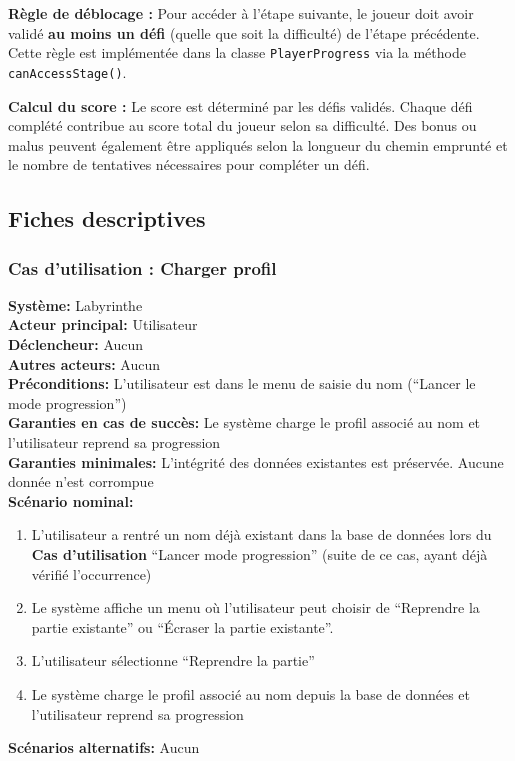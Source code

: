 \documentclass{butexFR}
\begin{document}
\vspace{1em}

\textbf{Règle de déblocage :} Pour accéder à l'étape suivante, le joueur doit avoir validé \textbf{au moins un défi} (quelle que soit la difficulté) de l'étape précédente. Cette règle est implémentée dans la classe \texttt{PlayerProgress} via la méthode \texttt{canAccessStage()}.

\textbf{Calcul du score :} Le score est déterminé par les défis validés. Chaque défi complété contribue au score total du joueur selon sa difficulté. Des bonus ou malus peuvent également être appliqués selon la longueur du chemin emprunté et le nombre de tentatives nécessaires pour compléter un défi.

\newpage

\subsection{Fiches descriptives}
\subsubsection{Cas d'utilisation : Charger profil}
\textbf{Système:} Labyrinthe\\
\textbf{Acteur principal:} Utilisateur\\
\textbf{Déclencheur:} Aucun\\
\textbf{Autres acteurs:} Aucun\\[0.25em]
\textbf{Préconditions:} L'utilisateur est dans le menu de saisie du nom (``Lancer le mode progression'')\\
\textbf{Garanties en cas de succès:} Le système charge le profil associé au nom et l'utilisateur reprend sa progression\\
\textbf{Garanties minimales:} L'intégrité des données existantes est préservée. Aucune donnée n'est corrompue\\[0.25em]
\textbf{Scénario nominal:}
\begin{enumerate}
    \item L'utilisateur a rentré un nom déjà existant dans la base de données lors du \textbf{Cas d'utilisation} ``Lancer mode progression'' (suite de ce cas, ayant déjà vérifié l'occurrence)
    \item Le système affiche un menu où l'utilisateur peut choisir de ``Reprendre la partie existante'' ou ``Écraser la partie existante''.
    \item L'utilisateur sélectionne ``Reprendre la partie''
    \item Le système charge le profil associé au nom depuis la base de données et l'utilisateur reprend sa progression
\end{enumerate}
\textbf{Scénarios alternatifs:} Aucun
\end{document}
